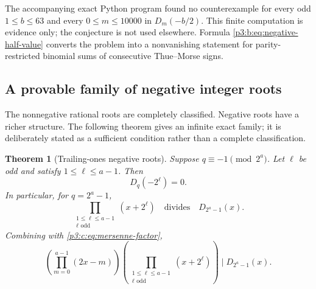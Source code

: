\documentclass[11pt,oneside]{article}
\numberwithin{equation}{section}
\newtheorem{theorem}{Theorem}[section]
\theoremstyle{definition}
\theoremstyle{remark}
\begin{document}
The accompanying exact Python program found no counterexample for every odd
$1\le b\le63$ and every $0\le m\le10000$ in
$D_m(-b/2)$.  This finite computation is evidence only; the conjecture is
not used elsewhere.  Formula \eqref{p3:b:eq:negative-half-value} converts the
problem into a nonvanishing statement for parity-restricted binomial sums of
consecutive Thue--Morse signs.
\subsection{A provable family of negative integer roots}

The nonnegative rational roots are completely classified.  Negative roots
have a richer structure.  The following theorem gives an infinite exact
family; it is deliberately stated as a sufficient condition rather than a
complete classification.

\begin{theorem}[Trailing-ones negative roots]\label{p3:c:thm:negative-family}
Suppose \(q\equiv-1\pmod{2^a}\).  Let \(\ell\) be odd and satisfy
\(1\leq\ell\leq a-1\).  Then
\begin{equation}
 D_q(-2^\ell)=0.                                       \label{p3:c:eq:negative-family}
\end{equation}
In particular, for \(q=2^a-1\),
\begin{equation}
 \prod_{\substack{1\leq\ell\leq a-1\\\ell\text{ odd}}}
 (x+2^\ell)
 \quad\text{divides}\quad D_{2^a-1}(x).               \label{p3:c:eq:negative-mersenne-factor}
\end{equation}
Combining with \cref{p3:c:eq:mersenne-factor},
\begin{equation}
 \left(\prod_{m=0}^{a-1}(2x-m)\right)
 \left(\prod_{\substack{1\leq\ell\leq a-1\\\ell\text{ odd}}}
 (x+2^\ell)\right)
 \mid D_{2^a-1}(x).                                    \label{p3:c:eq:combined-mersenne-factor}
\end{equation}
\end{theorem}
\end{document}

